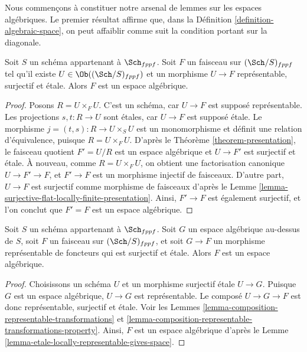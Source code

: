 \noindent
Nous commençons à constituer notre arsenal de lemmes sur les espaces algébriques.
Le premier résultat affirme que, dans la Définition \ref{definition-algebraic-space},
on peut affaiblir comme suit la condition portant sur la diagonale.

\begin{lemma}
\label{lemma-etale-locally-representable-gives-space}
Soit $S$ un schéma appartenant à $\Sch_{fppf}$.
Soit $F$ un faisceau sur $(\Sch/S)_{fppf}$
tel qu'il existe $U \in \Ob((\Sch/S)_{fppf})$ et un morphisme
$U \to F$ représentable, surjectif et \'etale.
Alors $F$ est un espace algébrique.
\end{lemma}

\begin{proof}
Posons $R = U \times_F U$. C'est un schéma, car $U \to F$ est supposé représentable.
Les projections $s, t : R \to U$ sont \'etales, car $U \to F$ est supposé \'etale.
Le morphisme $j = (t, s) : R \to U \times_S U$ est un monomorphisme et définit une relation
d'équivalence, puisque $R = U \times_F U$. D'après le Théorème \ref{theorem-presentation},
le faisceau quotient $F' = U/R$ est un espace algébrique et $U \to F'$
est surjectif et \'etale. À nouveau, comme $R = U \times_F U$, on obtient
une factorisation canonique $U \to F' \to F$, et $F' \to F$ est un morphisme injectif
de faisceaux. D'autre part, $U \to F$ est surjectif comme morphisme
de faisceaux d'après le Lemme \ref{lemma-surjective-flat-locally-finite-presentation}.
Ainsi, $F' \to F$ est également surjectif, et l'on conclut que $F' = F$ est un
espace algébrique.
\end{proof}

\begin{lemma}
\label{lemma-etale-locally-representable-by-space-gives-space}
Soit $S$ un schéma appartenant à $\Sch_{fppf}$. Soit $G$ un espace
algébrique au-dessus de $S$, soit $F$ un faisceau sur $(\Sch/S)_{fppf}$, et soit
$G \to F$ un morphisme représentable de foncteurs qui est
surjectif et \'etale. Alors $F$ est un espace algébrique.
\end{lemma}

\begin{proof}
Choisissons un schéma $U$ et un morphisme surjectif \'etale $U \to G$.
Puisque $G$ est un espace algébrique, $U \to G$ est représentable.
Le composé $U \to G \to F$ est donc représentable,
surjectif et \'etale. Voir les Lemmes
\ref{lemma-composition-representable-transformations} et
\ref{lemma-composition-representable-transformations-property}.
Ainsi, $F$ est un espace algébrique d'après le
Lemme \ref{lemma-etale-locally-representable-gives-space}.
\end{proof}

